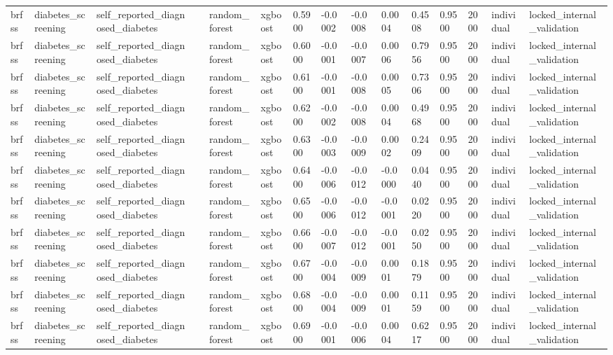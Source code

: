 \begin{tabular}{lllllllllllllll}
brfss & diabetes\_screening & self\_reported\_diagnosed\_diabetes &  & random\_forest & xgboost & 0.5900 & -0.0002 & -0.0008 & 0.0004 & 0.4508 & 0.9500 & 2000 & individual & locked\_internal\_validation \\
brfss & diabetes\_screening & self\_reported\_diagnosed\_diabetes &  & random\_forest & xgboost & 0.6000 & -0.0001 & -0.0007 & 0.0006 & 0.7956 & 0.9500 & 2000 & individual & locked\_internal\_validation \\
brfss & diabetes\_screening & self\_reported\_diagnosed\_diabetes &  & random\_forest & xgboost & 0.6100 & -0.0001 & -0.0008 & 0.0005 & 0.7306 & 0.9500 & 2000 & individual & locked\_internal\_validation \\
brfss & diabetes\_screening & self\_reported\_diagnosed\_diabetes &  & random\_forest & xgboost & 0.6200 & -0.0002 & -0.0008 & 0.0004 & 0.4968 & 0.9500 & 2000 & individual & locked\_internal\_validation \\
brfss & diabetes\_screening & self\_reported\_diagnosed\_diabetes &  & random\_forest & xgboost & 0.6300 & -0.0003 & -0.0009 & 0.0002 & 0.2409 & 0.9500 & 2000 & individual & locked\_internal\_validation \\
brfss & diabetes\_screening & self\_reported\_diagnosed\_diabetes &  & random\_forest & xgboost & 0.6400 & -0.0006 & -0.0012 & -0.0000 & 0.0440 & 0.9500 & 2000 & individual & locked\_internal\_validation \\
brfss & diabetes\_screening & self\_reported\_diagnosed\_diabetes &  & random\_forest & xgboost & 0.6500 & -0.0006 & -0.0012 & -0.0001 & 0.0220 & 0.9500 & 2000 & individual & locked\_internal\_validation \\
brfss & diabetes\_screening & self\_reported\_diagnosed\_diabetes &  & random\_forest & xgboost & 0.6600 & -0.0007 & -0.0012 & -0.0001 & 0.0250 & 0.9500 & 2000 & individual & locked\_internal\_validation \\
brfss & diabetes\_screening & self\_reported\_diagnosed\_diabetes &  & random\_forest & xgboost & 0.6700 & -0.0004 & -0.0009 & 0.0001 & 0.1879 & 0.9500 & 2000 & individual & locked\_internal\_validation \\
brfss & diabetes\_screening & self\_reported\_diagnosed\_diabetes &  & random\_forest & xgboost & 0.6800 & -0.0004 & -0.0009 & 0.0001 & 0.1159 & 0.9500 & 2000 & individual & locked\_internal\_validation \\
brfss & diabetes\_screening & self\_reported\_diagnosed\_diabetes &  & random\_forest & xgboost & 0.6900 & -0.0001 & -0.0006 & 0.0004 & 0.6217 & 0.9500 & 2000 & individual & locked\_internal\_validation \\

\end{tabular}
